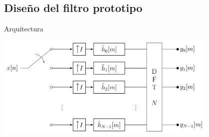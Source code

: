 \documentclass[ignorenonframetext,12pt]{beamer}
\begin{document}
\subsection{Diseño del filtro prototipo}
\begin{frame}{Arquitectura}
        \begin{center}
                \includegraphics[width=0.8\textwidth]{PFB_final_arquitecture}
        \end{center}
\end{frame}
\end{document}
